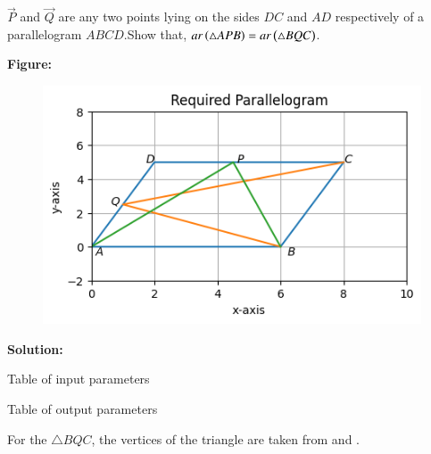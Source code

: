 $\vec{P}$ and $\vec{Q}$ are any two points lying on the sides $DC$ and $AD$ respectively of a parallelogram $ABCD$.Show that, $ar\left(\triangle APB\right)=ar\left(\triangle BQC\right)$.


\textbf{Figure:}
\begin{figure}[H]
    \centering
	\includegraphics[width=\columnwidth]{chapters/vectors/exer/figs/1.png}
    \caption{}
    \label{fig:fig:1}
\end{figure}


\textbf{Solution:}
\begin{table}[H]
   \centering
  
   \caption{Table of input parameters}        
\label{tab:tab:1}                    
\end{table}




\begin{table}[H]
    \centering                                  
                  
\caption{Table of output parameters}
\label{tab:tab:2}
 \end{table}


For the $\triangle BQC$, the vertices of the triangle are taken from  and .

